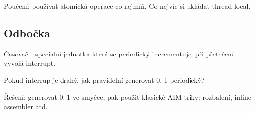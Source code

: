 Poučení: používat atomická operace co nejmíň. Co nejvíc si ukládat thread-local.

\subsection{Odbočka}
Časovač - specialní jednotka která se periodický incrementuje, při přetečení vyvolá interrupt.

Pokud interrup je drahý, jak pravidelní generovat 0, 1 periodický?

Řešení: generovat 0, 1 ve smyčce, pak použit klasické AIM triky: rozbalení, inline assembler atd.
